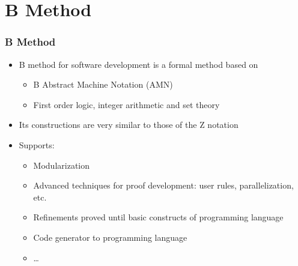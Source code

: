 \section{B Method}

\begin{frame}
\hypertarget{metodoB}{}
  \frametitle{B Method} 
  \begin{itemize}
    \item B method for software development is a formal method based on
	    \begin{itemize}
	    \item  B Abstract Machine Notation (AMN)
	    \item  First order logic, integer arithmetic and set theory
	    \end{itemize}
    \item Its constructions are very similar to those of the Z notation    
    \item Supports:
    \begin{itemize}
	    \item Modularization
	    \item Advanced techniques for proof development: user rules, parallelization, etc.
	    \item Refinements proved until basic constructs of programming language  
	    \item Code generator to programming language
	    \item \ldots
    \end{itemize}   
  \end{itemize}
\end{frame}
    
